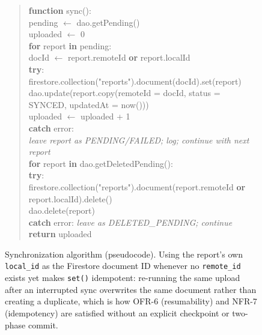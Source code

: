 \begin{figure}[htbp]
\begin{center}
\begin{minipage}{0.92\textwidth}
\begin{quote}
\ttfamily\small
\textbf{function} sync(): \\
\hspace*{1em} pending $\leftarrow$ dao.getPending() \\
\hspace*{1em} uploaded $\leftarrow$ 0 \\
\hspace*{1em} \textbf{for} report \textbf{in} pending: \\
\hspace*{2em} docId $\leftarrow$ report.remoteId \textbf{or} report.localId \\
\hspace*{2em} \textbf{try}: \\
\hspace*{3em} firestore.collection("reports").document(docId).set(report) \\
\hspace*{3em} dao.update(report.copy(remoteId = docId, status = SYNCED, updatedAt = now())) \\
\hspace*{3em} uploaded $\leftarrow$ uploaded + 1 \\
\hspace*{2em} \textbf{catch} error: \\
\hspace*{3em} \textit{leave report as PENDING/FAILED; log; continue with next report} \\
\hspace*{1em} \textbf{for} report \textbf{in} dao.getDeletedPending(): \\
\hspace*{2em} \textbf{try}: \\
\hspace*{3em} firestore.collection("reports").document(report.remoteId \textbf{or} report.localId).delete() \\
\hspace*{3em} dao.delete(report) \\
\hspace*{2em} \textbf{catch} error: \textit{leave as DELETED\_PENDING; continue} \\
\hspace*{1em} \textbf{return} uploaded
\end{quote}
\end{minipage}
\end{center}
\caption{Synchronization algorithm (pseudocode). Using the report's own
\texttt{local\_id} as the Firestore document ID whenever no
\texttt{remote\_id} exists yet makes \texttt{set()} idempotent: re-running
the same upload after an interrupted sync overwrites the same document
rather than creating a duplicate, which is how OFR-6 (resumability) and
NFR-7 (idempotency) are satisfied without an explicit checkpoint or
two-phase commit.}
\label{alg:sync}
\end{figure}

